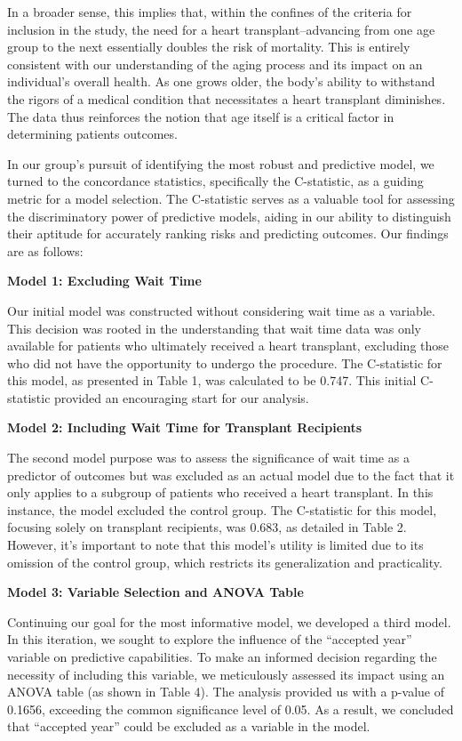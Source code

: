 \documentclass[
  letterpaper,
  DIV=11,
  numbers=noendperiod]{scrreprt}
\begin{document}
In a broader sense, this implies that, within the confines of the
criteria for inclusion in the study, the need for a heart
transplant--advancing from one age group to the next essentially doubles
the risk of mortality. This is entirely consistent with our
understanding of the aging process and its impact on an individual's
overall health. As one grows older, the body's ability to withstand the
rigors of a medical condition that necessitates a heart transplant
diminishes. The data thus reinforces the notion that age itself is a
critical factor in determining patients outcomes.

In our group's pursuit of identifying the most robust and predictive
model, we turned to the concordance statistics, specifically the
C-statistic, as a guiding metric for a model selection. The C-statistic
serves as a valuable tool for assessing the discriminatory power of
predictive models, aiding in our ability to distinguish their aptitude
for accurately ranking risks and predicting outcomes. Our findings are
as follows:

\textbf{Model 1: Excluding Wait Time}

Our initial model was constructed without considering wait time as a
variable. This decision was rooted in the understanding that wait time
data was only available for patients who ultimately received a heart
transplant, excluding those who did not have the opportunity to undergo
the procedure. The C-statistic for this model, as presented in Table 1,
was calculated to be 0.747. This initial C-statistic provided an
encouraging start for our analysis.

\textbf{Model 2: Including Wait Time for Transplant Recipients}

The second model purpose was to assess the significance of wait time as
a predictor of outcomes but was excluded as an actual model due to the
fact that it only applies to a subgroup of patients who received a heart
transplant. In this instance, the model excluded the control group. The
C-statistic for this model, focusing solely on transplant recipients,
was 0.683, as detailed in Table 2. However, it's important to note that
this model's utility is limited due to its omission of the control
group, which restricts its generalization and practicality.

\textbf{Model 3: Variable Selection and ANOVA Table}

Continuing our goal for the most informative model, we developed a third
model. In this iteration, we sought to explore the influence of the
``accepted year'' variable on predictive capabilities. To make an
informed decision regarding the necessity of including this variable, we
meticulously assessed its impact using an ANOVA table (as shown in Table
4). The analysis provided us with a p-value of 0.1656, exceeding the
common significance level of 0.05. As a result, we concluded that
``accepted year'' could be excluded as a variable in the model.
\end{document}
